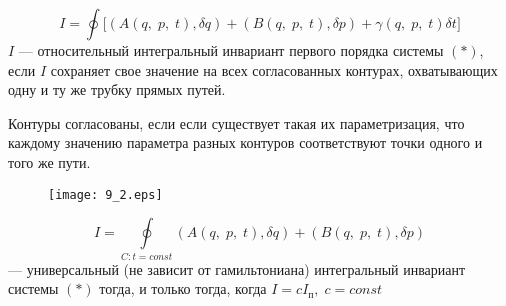 \begin{df}
	\[
		I = \oint\big[(A(q,\; p,\; t),\delta q) + (B(q,\; p, \; t), \delta p) + \gamma(q,\; p, \; t)\delta t\big]
	\]
	$I$ --- относительный интегральный инвариант первого порядка системы $(*)$, если $I$ сохраняет свое значение на всех согласованных контурах, охватывающих одну и ту же трубку прямых путей.
\end{df}
\begin{df}
	Контуры согласованы, если если существует такая их параметризация, что каждому значению параметра разных контуров соответствуют точки одного и того же пути.
\end{df}
\begin{figure}[H]
	\texttt{[image: 9\_2.eps]}
\end{figure}

\begin{teo}
	\[ 
		I = \oint\limits_{C: t = const} (A(q,\; p,\; t), \delta q) + (B(q,\; p, \; t), \delta p)
	\] 
	--- универсальный (не зависит от гамильтониана) интегральный инвариант системы $(*)$ тогда, и только тогда, когда $I = cI_\text{п},\; c = const$
\end{teo}
